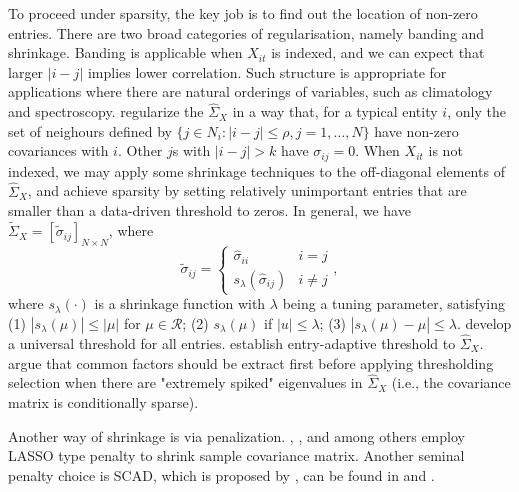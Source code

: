 To proceed under sparsity, the key job is to find out the location of non-zero entries. There are two broad categories of regularisation, namely banding and shrinkage.  Banding is applicable when $X_{it}$ is indexed, and we can expect that larger $|i-j|$ implies lower correlation. Such structure is appropriate for applications where there are natural orderings of variables, such as climatology and spectroscopy. \cite{bickel2008regularized} regularize the ${\hat{\Sigma}_{X}}$ in a way that, for a typical entity $i$, only the set of neighours defined by $\{j\in {N_i}: |i-j|\leq \rho, j=1,\dots,N \}$ have non-zero covariances with $i$. Other $j$s with $|i-j|>k$ have $\sigma_{ij}=0$. When $X_{it}$ is not indexed, we may apply some shrinkage techniques to the off-diagonal elements of ${\hat{\Sigma}_{X}}$, and achieve sparsity by setting relatively unimportant entries that are smaller than a data-driven threshold to zeros.  In general, we have ${\tilde{\Sigma}_{X}}=[\tilde{\sigma}_{ij}]_{N\times N}$, where
\begin{equation}
    \tilde{\sigma}_{ij}=\left\{ \begin{array}{cc}
      \hat{\sigma}_{ii}   & i=j \\
       s_{\lambda}(\hat{\sigma}_{ij})  & i\neq j
    \end{array}\right.,
\end{equation}
where $s_{\lambda}(\cdot)$ is a shrinkage function with $\lambda$ being a tuning parameter, satisfying (1) $|s_{\lambda}(\mu)|\leq|\mu|$ for $\mu \in \mathcal{R}$; (2) $s_{\lambda}(\mu)$ if $|u|\leq \lambda$; (3) $|s_{\lambda}(\mu)-\mu|\leq \lambda$. \citet{bickel2008covariance} develop a universal threshold for all entries. \citet{cai2011adaptive} establish entry-adaptive threshold to ${\hat{\Sigma}_{X}}$. \citet{fan2013large} argue that common factors should be extract first before applying thresholding selection when there are "extremely spiked" eigenvalues in ${\hat{\Sigma}_{X}}$ (i.e., the covariance matrix is conditionally sparse). 

Another way of shrinkage is via penalization. \citet{yuan2007model}, \citet{d2008first}, \citet{rothman2008sparse} and \citet{friedman2008sparse} among others employ LASSO type penalty to shrink sample covariance matrix. Another seminal penalty choice is SCAD, which is proposed by \citet{fan2001variable}, can be found in \citet{fan2009network} and \citet{lam2009sparsistency}.

